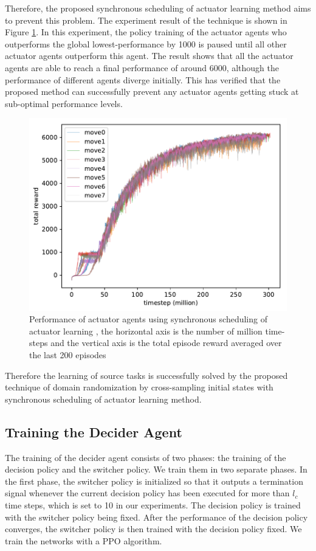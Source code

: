 Therefore, the proposed synchronous scheduling of actuator learning method aims to prevent this problem. The experiment result of the technique is shown in Figure \ref{rec_sync_training}. In this experiment, the policy training of the actuator agents who outperforms the global lowest-performance by 1000 is paused until all other actuator agents outperform this agent. The result shows that all the actuator agents are able to reach a final performance of around 6000, although the performance of different agents diverge initially. This has verified that the proposed method can successfully prevent any actuator agents getting stuck at sub-optimal performance levels. 

\begin{figure}[!htbp]
	\includegraphics[width=\textwidth]{images/rec_180619_sync.pdf}
	\centering
	\caption{Performance of actuator agents using synchronous scheduling of actuator learning , the horizontal axis is the number of million time-steps and the vertical axis is the total episode reward averaged over the last 200 episodes}\label{rec_sync_training}
\end{figure}

Therefore the learning of source tasks is successfully solved by the proposed technique of domain randomization by cross-sampling initial states with synchronous scheduling of actuator learning method.
\subsection{Training the Decider Agent}
The training of the decider agent consists of two phases: the training of the decision policy and the switcher policy. We train them in two separate phases. In the first phase, the switcher policy is initialized so that it outputs a termination signal whenever the current decision policy has been executed for more than $l_c$ time steps, which is set to 10 in our experiments. The decision policy is trained with the switcher policy being fixed. After the performance of the decision policy converges, the switcher policy is then trained with the decision policy fixed. We train the networks with a PPO algorithm.

